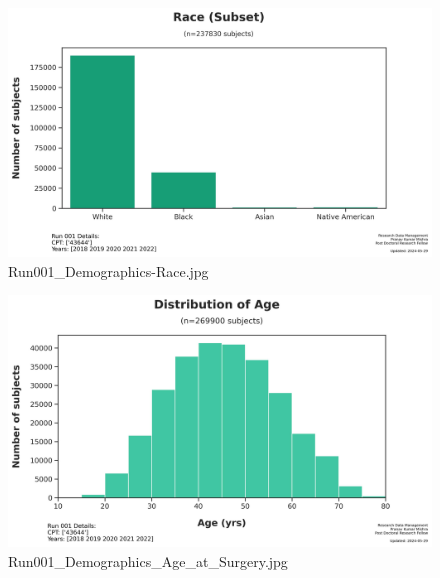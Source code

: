 \documentclass[
  letterpaper,
  DIV=11,
  numbers=noendperiod]{scrartcl}
\begin{document}
\begin{figure}[H]

{\centering \includegraphics{figures/demographics/Run001_Demographics-Race.jpg}

}

\caption{Run001\_Demographics-Race.jpg}

\end{figure}%
\begin{figure}[H]

{\centering \includegraphics{figures/demographics/Run001_Demographics_Age_at_Surgery.jpg}

}

\caption{Run001\_Demographics\_Age\_at\_Surgery.jpg}

\end{figure}%
\end{document}
